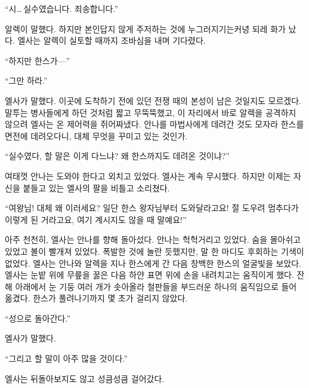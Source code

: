 ``시\ldots\,실수였습니다. 죄송합니다.''

알렉이 말했다. 하지만 본인답지 않게 주저하는 것에 누그러지기는커녕 되레 화가 났다. 엘사는 알렉이 실토할 때까지 조바심을 내며 기다렸다.

``하지만 한스가—''

``그만 하라.''

엘사가 말했다. 이곳에 도착하기 전에 있던 전쟁 때의 본성이 남은 것일지도 모르겠다. 말투는 병사들에게 하던 것처럼 짧고 무뚝뚝했고, 이 자리에서 바로 알렉을 공격하지 않으려 엘사는 온 제어력을 쥐어짜냈다. 안나를 마법사에게 데려간 것도 모자라 한스를 면전에 데려오다니, 대체 무엇을 꾸미고 있는 것인가.

``실수였다, 할 말은 이게 다느냐? 왜 한스까지도 데려온 것이냐?''

여태껏 안나는 도와야 한다고 외치고 있었다. 엘사는 계속 무시했다. 하지만 이제는 자신을 붙들고 있는 엘사의 팔을 비틀고 소리쳤다.

``여왕님! 대체 왜 이러세요? 일단 한스 왕자님부터 도와달라고요! 절 도우려 멈추다가 이렇게 된 거라고요, 여기 계시지도 않을 때 말예요!''

아주 천천히, 엘사는 안나를 향해 돌아섰다. 안나는 헉헉거리고 있었다. 숨을 몰아쉬고 있었고 볼이 빨개져 있었다. 폭발한 것에 놀란 듯했지만, 말 한 마디도 후회하는 기색이 없었다. 엘사는 안나와 알렉을 지나 한스에게 간 다음 창백한 한스의 얼굴빛을 보았다. 엘사는 눈밭 위에 무릎을 꿇은 다음 하얀 표면 위에 손을 내려치고는 움직이게 했다. 잔해 아래에서 눈 기둥 여러 개가 솟아올라 철판들을 부드러운 하나의 움직임으로 들어 옮겼다. 한스가 풀려나기까지 몇 초가 걸리지 않았다.

``성으로 돌아간다.''

엘사가 말했다.

``그리고 할 말이 아주 많을 것이다.''

엘사는 뒤돌아보지도 않고 성큼성큼 걸어갔다.

